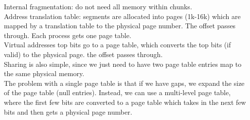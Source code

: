 \documentclass[paper=a4, fontsize=11pt]{scrartcl} %
\numberwithin{equation}{section} %
\numberwithin{figure}{section} %
\numberwithin{table}{section} %
\begin{document}
Internal fragmentation: do not need all memory within chunks. \\
Address translation table: segments are allocated into pages (1k-16k) which are mapped by a translation table to the physical page number. The offset passes through. Each process gets one page table. \\
Virtual addresses top bits go to a page table, which converts the top bits (if valid) to the physical page. the offset passes through. \\
Sharing is also simple, since we just need to have two page table entries map to the same physical memory. \\
The problem with a single page table is that if we have gaps, we expand the size of the page table (null entries). Instead, we can use a multi-level page table, where the first few bits are converted to a page table which takes in the next few bits and then gets a physical page number. \\
\end{document}
